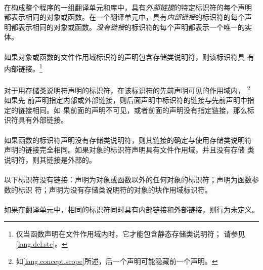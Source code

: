 \paragraph{}
在构成整个程序的一组翻译单元和库中，具有\textit{外部链接}的特定标识符的每个声明
都表示相同的对象或函数。在一个翻译单元中，具有\textit{内部链接}的标识符的每个声
明都表示相同的对象或函数。\textit{没有链接}的标识符的每个声明都表示一个唯一的实
体。

\paragraph{}
如果对象或函数的文件作用域标识符的声明包含存储类说明符，则该标识符具
有内部链接。\footnote{仅当函数声明在文件作用域内时，它才能包含静态存储类说明符；
请参见\ref{lang.dcl.stc}。}

\paragraph{}
对于用存储类说明符声明的标识符，在该标识符的先前声明可见的作用域内，
\footnote{如\ref{lang.concept.scope}所述，后一个声明可能隐藏前一个声明。} 如果先
前声明指定内部或外部链接，则后面声明中标识符的链接与先前声明中指定的链接相同。如
果前面的声明不可见，或者前面的声明没有指定链接，那么标识符具有外部链接。

\paragraph{}
如果函数的标识符声明没有存储类说明符，则其链接的确定与使用存储类说明符
声明的链接完全相同。如果对象的标识符声明具有文件作用域，并且没有存储
类说明符，则其链接是外部的。

\paragraph{}
以下标识符没有链接：声明为对象或函数以外的任何对象的标识符；声明为函数参数的标识
符；声明为没有存储类说明符的对象的块作用域标识符。

\paragraph{}
如果在翻译单元中，相同的标识符同时具有内部链接和外部链接，则行为未定义。

